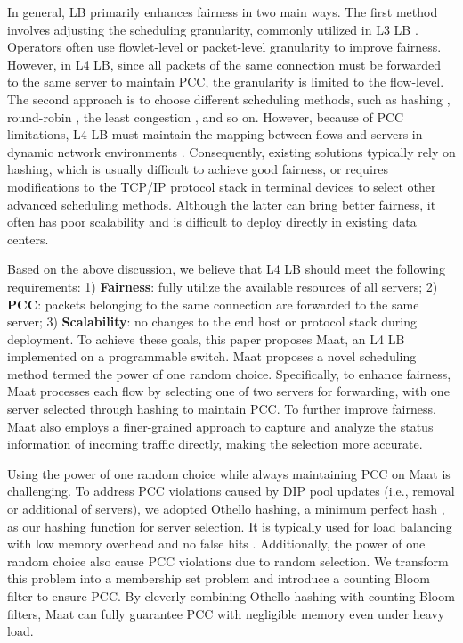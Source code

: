 In general, LB primarily enhances fairness in two main ways. The first method involves adjusting the scheduling granularity, commonly utilized in L3 LB \cite{aghdai2020spotlight}. Operators often use flowlet-level \cite{alizadeh2014conga, katta2016hula, liu2023burstbalancer} or packet-level \cite{perry2014fastpass} granularity to improve fairness. However, in L4 LB, since all packets of the same connection must be forwarded to the same server to maintain PCC, the granularity is limited to the flow-level. The second approach is to choose different scheduling methods, such as hashing \cite{miao2017silkroad, gandhi2014duet}, round-robin \cite{katta2016clove, he2015presto}, the least congestion \cite{alizadeh2014conga, curtis2011mahout}, and so on. However, because of PCC limitations, L4 LB must maintain the mapping between flows and servers in dynamic network environments \cite{araujo2018balancing}.
Consequently, existing solutions typically rely on hashing, which is usually difficult to achieve good fairness, or requires modifications to the TCP/IP protocol stack in terminal devices to select other advanced scheduling methods. Although the latter can bring better fairness, it often has poor scalability and is difficult to deploy directly in existing data centers.

Based on the above discussion, we believe that L4 LB should meet the following requirements: 1) \textbf{Fairness}: fully utilize the available resources of all servers; 2) \textbf{PCC}: packets belonging to the same connection are forwarded to the same server; 3) \textbf{Scalability}: no changes to the end host or protocol stack during deployment. To achieve these goals, this paper proposes Maat, an L4 LB implemented on a programmable switch. Maat proposes a novel scheduling method termed the power of one random choice. Specifically, to enhance fairness, Maat processes each flow by selecting one of two servers for forwarding, with one server selected through hashing to maintain PCC. To further improve fairness, Maat also employs a finer-grained approach to capture and analyze the status information of incoming traffic directly, making the selection more accurate.

Using the power of one random choice while always maintaining PCC on Maat is challenging. To address PCC violations caused by DIP pool updates (i.e., removal or additional of servers), we adopted Othello hashing, a minimum perfect hash \cite{majewski1996family}, as our hashing function for server selection. It is typically used for load balancing with low memory overhead and no false hits \cite{yu2018memory}. Additionally, the power of one random choice also cause PCC violations due to random selection. We transform this problem into a membership set problem and introduce a counting Bloom filter\cite{bonomi2006improved} to ensure PCC. By cleverly combining Othello hashing with counting Bloom filters, Maat can fully guarantee PCC with negligible memory even under heavy load.



